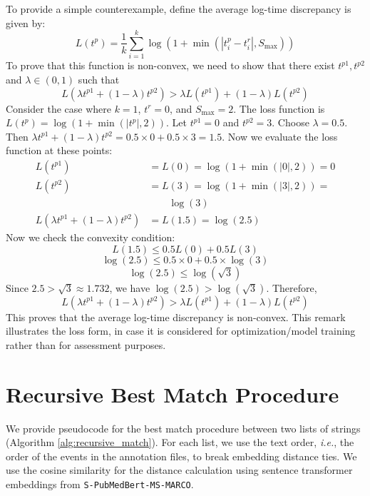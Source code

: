 To provide a simple counterexample, define the average log-time discrepancy is given by:
\[
L(t^p) = \frac{1}{k} \sum_{i=1}^k \log(1 + \min(|t^p_i - t^r_i|, S_{\text{max}}))
\]
To prove that this function is non-convex, we need to show that there exist $t^{p1}, t^{p2}$ and $\lambda \in (0,1)$ such that
\[
L(\lambda t^{p1} + (1-\lambda) t^{p2}) > \lambda L(t^{p1}) + (1-\lambda) L(t^{p2})
\]
Consider the case where $k=1$, $t^r = 0$, and $S_{\text{max}} = 2$. The loss function is $L(t^p) = \log(1 + \min(|t^p|, 2))$.
Let $t^{p1} = 0$ and $t^{p2} = 3$. Choose $\lambda = 0.5$.
Then $\lambda t^{p1} + (1-\lambda) t^{p2} = 0.5 \times 0 + 0.5 \times 3 = 1.5$.
Now we evaluate the loss function at these points:
\begin{align*}
L(t^{p1}) &= L(0) = \log(1 + \min(|0|, 2)) = 0 \\
L(t^{p2}) &= L(3) = \log(1 + \min(|3|, 2)) = \\
    & \qquad \log(3) \\
L(\lambda t^{p1} + (1-\lambda) t^{p2}) &= L(1.5) = \log(2.5)
\end{align*}
Now we check the convexity condition:
\[
L(1.5) \leq 0.5 L(0) + 0.5 L(3)
\]
\[
\log(2.5) \leq 0.5 \times 0 + 0.5 \times \log(3)
\]
\[
\log(2.5) \leq \log(\sqrt{3})
\]
Since $2.5 > \sqrt{3} \approx 1.732$, we have $\log(2.5) > \log(\sqrt{3})$.
Therefore,
\[
L(\lambda t^{p1} + (1-\lambda) t^{p2}) > \lambda L(t^{p1}) + (1-\lambda) L(t^{p2})
\]
This proves that the average log-time discrepancy is non-convex.
This remark illustrates the loss form, in case it is considered for optimization/model training rather than for assessment purposes.

\section{Recursive Best Match Procedure}
\label{apd:recursive_match}
We provide pseudocode for the best match procedure between two lists of strings (Algorithm \ref{alg:recursive_match}).  For each list, we use the text order, \emph{i.e.}, the order of the events in the annotation files, to break embedding distance ties.  We use the cosine similarity for the distance calculation using sentence transformer embeddings from \texttt{S-PubMedBert-MS-MARCO}.

